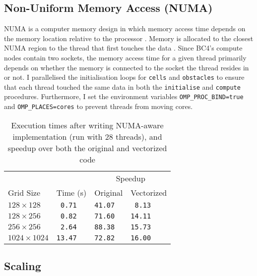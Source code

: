\documentclass[11pt, twocolumn, a4paper]{article}
\begin{document}
\subsection{Non-Uniform Memory Access (NUMA)}

NUMA is a computer memory design in which memory access time depends on the memory location relative to the processor \cite{numa}.
Memory is allocated to the closest NUMA region to the thread that first touches the data \cite{numa_bristol}.
Since BC4's compute nodes contain two sockets, the memory access time for a given thread primarily depends on whether the memory is connected to the socket the thread resides in or not.
I parallelised the initialisation loops for \texttt{cells} and \texttt{obstacles} to ensure that each thread touched the same data in both the \texttt{initialise} and \texttt{compute} procedures.
Furthermore, I set the environment variables \texttt{OMP\_PROC\_BIND=true} and \texttt{OMP\_PLACES=cores} to prevent threads from moving cores.

\begin{table}[htbp]
  \begin{center}
  \caption{Execution times after writing NUMA-aware implementation (run with 28 threads), and speedup over both the original and vectorized code}\label{tab:numa}
  \begin{tabular}{l | l  l  l} 
      \hline\hline
      &&\multicolumn{2}{c}{Speedup}\\
      \cline{3-4}
      Grid Size&Time (s)&Original&Vectorized\\
      \hline
      $128 \times 128$&\texttt{ 0.71}&\texttt{41.07}&\texttt{ 8.13}\\
      $128 \times 256$&\texttt{ 0.82}&\texttt{71.60}&\texttt{14.11}\\
      $256 \times 256$&\texttt{ 2.64}&\texttt{88.38}&\texttt{15.73}\\
      $1024 \times 1024$&\texttt{13.47}&\texttt{72.82}&\texttt{16.00}\\
      \hline
    \end{tabular}
  \end{center}
\end{table}

\subsection{Scaling}
\end{document}
